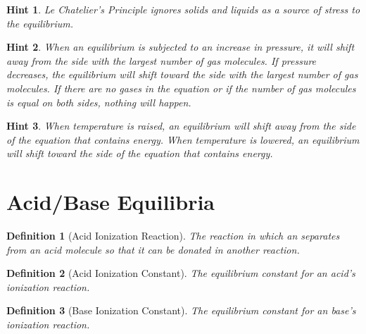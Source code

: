 \documentclass[11pt, oneside]{article}   	%
\newtheorem{definition}{Definition}
\newtheorem{hint}{Hint}
\begin{document}
\begin{hint}\label{hint:le-chatelier}
Le Chatelier's Principle ignores solids and liquids as a source of stress to the equilibrium.
\end{hint}

\begin{hint}\label{hint:le-chatelier-pressure}
When an equilibrium is subjected to an increase in pressure, it will shift away from the side with the largest number of gas molecules.
If pressure decreases, the equilibrium will shift toward the side with the largest number of gas molecules.
If there are no gases in the equation or if the number of gas molecules is equal on both sides, nothing will happen.
\end{hint}

\begin{hint}\label{hint:le-chatelier-temperature}
When temperature is raised, an equilibrium will shift away from the side of the equation that contains energy.
When temperature is lowered, an equilibrium will shift toward the side of the equation that contains energy.
\end{hint}

\section{Acid/Base Equilibria}

\begin{definition}[Acid Ionization Reaction]\label{def:acid-ionization}
The reaction in which an  separates from an acid molecule so that it can be donated in another reaction.
\end{definition}

\begin{definition}[Acid Ionization Constant]\label{def:acid-ionization-constant}
The equilibrium constant for an acid's ionization reaction.
\end{definition}

\begin{definition}[Base Ionization Constant]\label{def:base-ionization-constant}
The equilibrium constant for an base's ionization reaction.
\end{definition}
\end{document}
